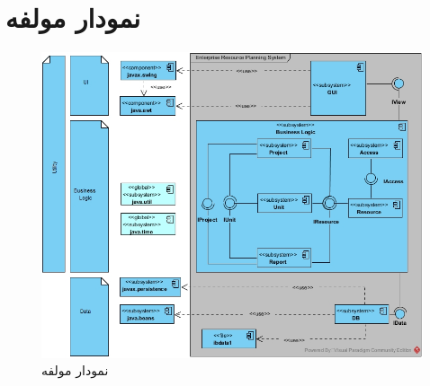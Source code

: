 
\chapter{نمودار مولفه}

\begin{figure}[H]
	\centering
	\includegraphics[scale=0.6]{img/comp/ComponentDiagram}
	\caption{نمودار مولفه}
\end{figure}

